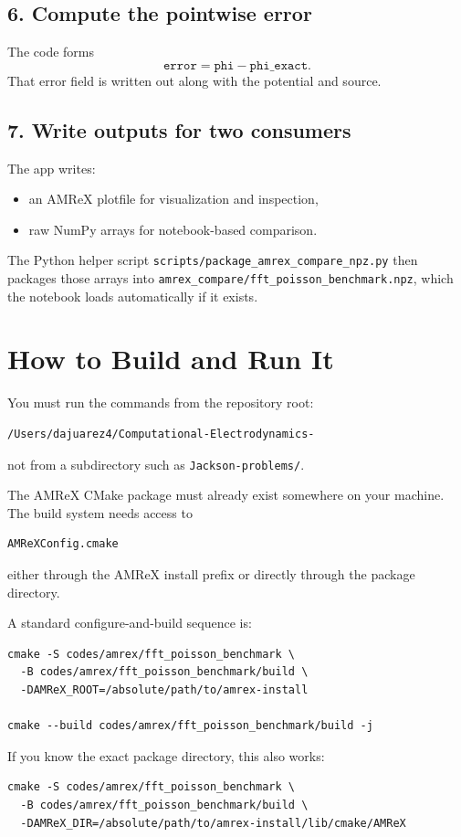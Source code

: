 \documentclass[11pt]{article}
\begin{document}
\subsection*{6. Compute the pointwise error}
The code forms
\[
\texttt{error} = \texttt{phi} - \texttt{phi\_exact}.
\]
That error field is written out along with the potential and source.

\subsection*{7. Write outputs for two consumers}
The app writes:
\begin{itemize}
\item an AMReX plotfile for visualization and inspection,
\item raw NumPy arrays for notebook-based comparison.
\end{itemize}

The Python helper script
\texttt{scripts/package\_amrex\_compare\_npz.py}
then packages those arrays into
\texttt{amrex\_compare/fft\_poisson\_benchmark.npz},
which the notebook loads automatically if it exists.

\section{How to Build and Run It}
You must run the commands from the repository root:
\begin{verbatim}
/Users/dajuarez4/Computational-Electrodynamics-
\end{verbatim}
not from a subdirectory such as \texttt{Jackson-problems/}.

The AMReX CMake package must already exist somewhere on your machine. The build system needs access to
\begin{verbatim}
AMReXConfig.cmake
\end{verbatim}
either through the AMReX install prefix or directly through the package directory.

A standard configure-and-build sequence is:
\begin{verbatim}
cmake -S codes/amrex/fft_poisson_benchmark \
  -B codes/amrex/fft_poisson_benchmark/build \
  -DAMReX_ROOT=/absolute/path/to/amrex-install

cmake --build codes/amrex/fft_poisson_benchmark/build -j
\end{verbatim}

If you know the exact package directory, this also works:
\begin{verbatim}
cmake -S codes/amrex/fft_poisson_benchmark \
  -B codes/amrex/fft_poisson_benchmark/build \
  -DAMReX_DIR=/absolute/path/to/amrex-install/lib/cmake/AMReX
\end{verbatim}
\end{document}

